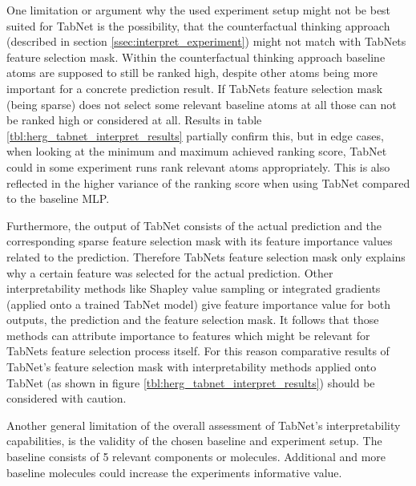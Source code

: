 \documentclass[../main.tex]{subfiles}
\begin{document}
One limitation or argument why the used experiment setup might not be best suited for TabNet is the possibility, that the counterfactual thinking approach (described in section \ref{ssec:interpret_experiment}) might not match with TabNets feature selection mask. Within the counterfactual thinking approach baseline atoms are supposed to still be ranked high, despite other atoms being more important for a concrete prediction result. If TabNets feature selection mask (being sparse) does not select some relevant baseline atoms at all those can not be ranked high or considered at all. Results in table \ref{tbl:herg_tabnet_interpret_results} partially confirm this, but in edge cases, when looking at the minimum and maximum achieved ranking score, TabNet could in some experiment runs rank relevant atoms appropriately. This is also reflected in the higher variance of the ranking score when using TabNet compared to the baseline MLP.
\newline 

Furthermore, the output of TabNet consists of the actual prediction and the corresponding sparse feature selection mask with its feature importance values related to the prediction. Therefore TabNets feature selection mask only explains why a certain feature was selected for the actual prediction. Other interpretability methods like Shapley value sampling or integrated gradients (applied onto a trained TabNet model) give feature importance value for both outputs, the prediction and the feature selection mask. It follows that those methods can attribute importance to features which might be relevant for TabNets feature selection process itself. For this reason comparative results of TabNet's feature selection mask with interpretability methods applied onto TabNet (as shown in figure \ref{tbl:herg_tabnet_interpret_results}) should be considered with caution. 
\newline

Another general limitation of the overall assessment of TabNet's interpretability capabilities, is the validity of the chosen baseline and experiment setup. The baseline consists of 5 relevant components or molecules. Additional and more baseline molecules could increase the experiments informative value. 
\end{document}
